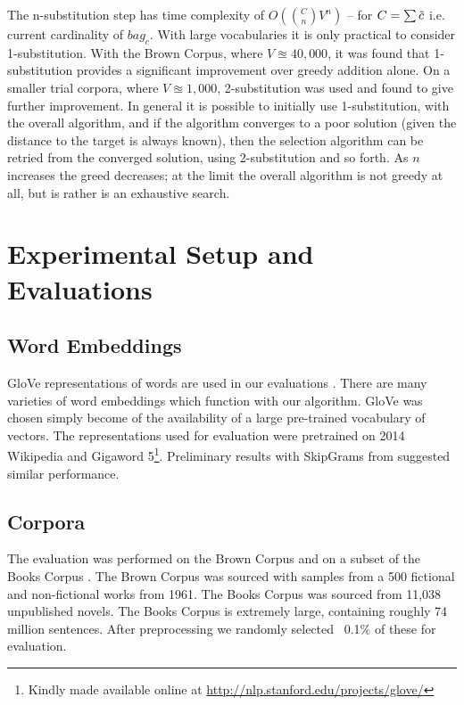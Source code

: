 \documentclass{llncs}
\begin{document}
The n-substitution step has time complexity of $O(\binom{C}{n}V^n)$  -- for $C=\sum \tilde{c}$ i.e. current cardinality of $bag_c$. With large vocabularies it is only practical to consider 1-substitution. With the Brown Corpus, where $V\approxeq 40,000$, it was found that 1-substitution provides a significant improvement over greedy addition alone. On a smaller trial corpora, where $V\approxeq 1,000$, 2-substitution was used and found to give further improvement. In general it is possible to initially use 1-substitution, with the overall algorithm, and if the algorithm converges to a poor solution (given the distance to the target is always known), then the selection algorithm can be retried from the converged solution, using 2-substitution and so forth. As $n$ increases the greed decreases; at the limit the overall algorithm is not greedy at all, but is rather is an exhaustive search.


\section{Experimental Setup and Evaluations} \label{evalsettings}


\subsection{Word Embeddings}
GloVe representations of words are used in our evaluations \parencite{pennington2014glove}. There are many varieties of word embeddings which function with our algorithm. GloVe was chosen simply become of the availability of a large pre-trained vocabulary of vectors. The representations used for evaluation were pretrained on 2014 Wikipedia and Gigaword 5\footnote{Kindly made available online at \url{http://nlp.stanford.edu/projects/glove/}}. Preliminary results with SkipGrams from \textcite{mikolov2013efficient} suggested similar performance.

\subsection{Corpora}

The evaluation was performed on the Brown Corpus \parencite{francis1979brown} and on a subset of the Books Corpus \parencite{moviebook}. The Brown Corpus was sourced with samples from a 500 fictional and non-fictional works from 1961. The Books Corpus was sourced from 11,038 unpublished novels. The Books Corpus is extremely large, containing roughly 74 million sentences. After preprocessing we randomly selected ~0.1\% of these for evaluation.
\end{document}
